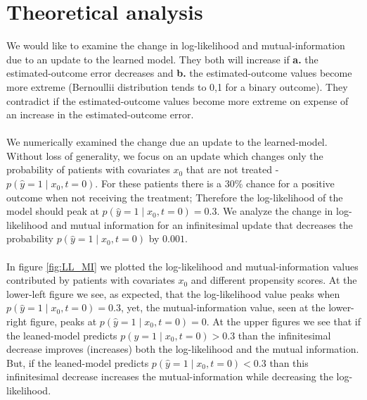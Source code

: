 \documentclass[oneside,12pt]{article}
\begin{document}
\section{Theoretical analysis}\label{sec:theo}
We would like to examine the change in log-likelihood and mutual-information due to an update to the learned model. They both will increase if \textbf{a.} the estimated-outcome error decreases and \textbf{b.} the estimated-outcome values become more extreme (Bernoullii distribution tends to 0,1 for a binary outcome). They contradict if the estimated-outcome values become more extreme on expense of an increase in the estimated-outcome error.\\\\
%
We numerically examined the change due an update to the learned-model. Without loss of generality, we focus on an update which changes only the probability of patients with covariates $x_0$ that are not treated - $p(\hat{y} = 1 \mid x_0, t=0)$. For these patients there is a 30\% chance for a positive outcome when not receiving the treatment; Therefore the log-likelihood of the model should peak at $p(\hat{y} = 1 \mid x_0, t=0) = 0.3$. We analyze the change in log-likelihood and mutual information for an infinitesimal update that decreases the probability $p(\hat{y} = 1 \mid x_0, t=0)$ by $0.001$.\\\\
%
In figure \ref{fig:LL_MI} we plotted the log-likelihood and mutual-information values contributed by patients with covariates $x_0$ and different propensity scores. At the lower-left figure we see, as expected, that the log-likelihood value peaks when $p(\hat{y} = 1 \mid x_0, t=0) = 0.3$, yet, the mutual-information value, seen at the lower-right figure, peaks at $p(\hat{y} = 1 \mid x_0, t=0) = 0$. At the upper figures we see that if the leaned-model predicts $p(\hat{y} = 1 \mid x_0, t=0) > 0.3$ than the infinitesimal decrease improves (increases) both the log-likelihood and the mutual information. But, if the leaned-model predicts $p(\hat{y} = 1 \mid x_0, t=0) < 0.3$ than this infinitesimal decrease increases the mutual-information while decreasing the log-likelihood.\\\\
%
\end{document}
